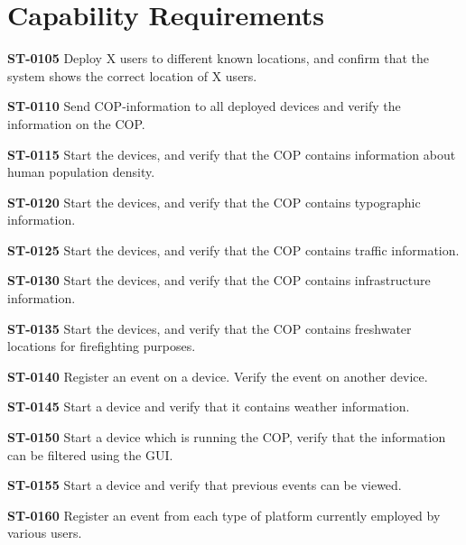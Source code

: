 \section{Capability Requirements}

\begin{description}

\item\textbf{ST-0105} Deploy X users to different known locations, and confirm that the system shows the correct location of X users. \\
\item\textbf{ST-0110} Send COP-information to all deployed devices and verify the information on the COP. \\
\item\textbf{ST-0115} Start the devices, and verify that the COP contains information about human population density. \\
\item\textbf{ST-0120} Start the devices, and verify that the COP contains typographic information. \\
\item\textbf{ST-0125} Start the devices, and verify that the COP contains traffic information. \\
\item\textbf{ST-0130} Start the devices, and verify that the COP contains infrastructure information. \\
\item\textbf{ST-0135} Start the devices, and verify that the COP contains freshwater locations for firefighting purposes. \\
\item\textbf{ST-0140} Register an event on a device. Verify the event on another device. \\
\item\textbf{ST-0145} Start a device and verify that it contains weather information. \\
\item\textbf{ST-0150} Start a device which is running the COP, verify that the information can be filtered using the GUI. \\
\item\textbf{ST-0155} Start a device and verify that previous events can be viewed. \\
\item\textbf{ST-0160} Register an event from each type of platform currently employed by various users. \\

\end{description}
